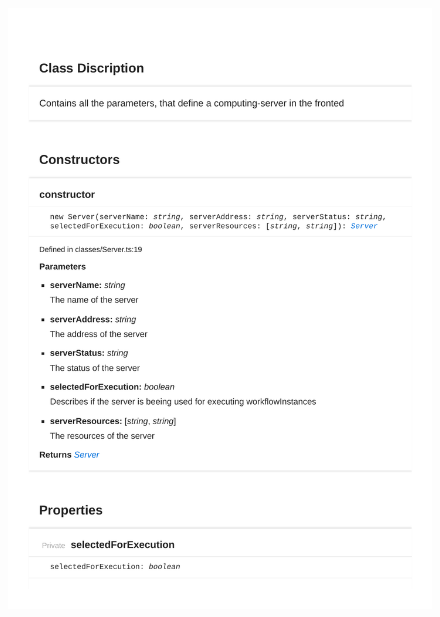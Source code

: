 \begin{figure}[H]
\centerline{\includegraphics[width=1\textwidth]{FrontendDocsAsPDF/Classes/Server.pdf}}
\end{figure}

